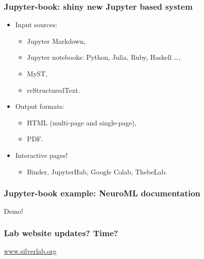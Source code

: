 \begin{frame}[c]
  \frametitle{Jupyter-book: shiny new Jupyter based system}
  \begin{itemize}
    \item Input sources:
      \begin{itemize}
        \item Jupyter Markdown,
        \item Jupyter notebooks: Python, Julia, Ruby, Haskell \ldots{},
        \item MyST,
        \item reStructuredText.
      \end{itemize}
    \item Output formats:
      \begin{itemize}
        \item HTML (multi-page and single-page),
        \item PDF\@.
      \end{itemize}
    \item \alert{Interactive pages!}
      \begin{itemize}
        \item Binder, JupyterHub, Google Colab, ThebeLab\footnotemark[8]{}.
      \end{itemize}
  \end{itemize}
\end{frame}
\begin{frame}[c]
  \frametitle{Jupyter-book example: NeuroML documentation}
  Demo!
\end{frame}
\begin{frame}[c]
  \frametitle{Lab website updates? Time?}
  \href{www.silverlab.org}{www.silverlab.org}
\end{frame}

